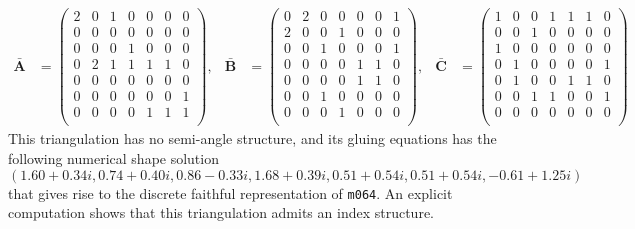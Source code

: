 \documentclass[12pt]{amsart}
\theoremstyle{definition}
\newcommand{\mb}{\mathbf}
\numberwithin{equation}{section}
\begin{document}
{\tiny
\begin{align*}
\bar{\mb A} &=\left(
\begin{array}{ccccccc}
 2 & 0 & 1 & 0 & 0 & 0 & 0 \\
 0 & 0 & 0 & 0 & 0 & 0 & 0 \\
 0 & 0 & 0 & 1 & 0 & 0 & 0 \\
 0 & 2 & 1 & 1 & 1 & 1 & 0 \\
 0 & 0 & 0 & 0 & 0 & 0 & 0 \\
 0 & 0 & 0 & 0 & 0 & 0 & 1 \\
 0 & 0 & 0 & 0 & 1 & 1 & 1 \\
 \end{array}
\right), &
\bar{\mb B} &=
\left(
\begin{array}{ccccccc}
 0 & 2 & 0 & 0 & 0 & 0 & 1 \\
 2 & 0 & 0 & 1 & 0 & 0 & 0 \\
 0 & 0 & 1 & 0 & 0 & 0 & 1 \\
 0 & 0 & 0 & 0 & 1 & 1 & 0 \\
 0 & 0 & 0 & 0 & 1 & 1 & 0 \\
 0 & 0 & 1 & 0 & 0 & 0 & 0 \\
 0 & 0 & 0 & 1 & 0 & 0 & 0 \\
\end{array}
\right), &
\bar{\mb C}&=
\left(
\begin{array}{ccccccc}
 1 & 0 & 0 & 1 & 1 & 1 & 0 \\
 0 & 0 & 1 & 0 & 0 & 0 & 0 \\
 1 & 0 & 0 & 0 & 0 & 0 & 0 \\
 0 & 1 & 0 & 0 & 0 & 0 & 1 \\
 0 & 1 & 0 & 0 & 1 & 1 & 0 \\
 0 & 0 & 1 & 1 & 0 & 0 & 1 \\
 0 & 0 & 0 & 0 & 0 & 0 & 0 \\
\end{array}
\right)
\end{align*}
}
This triangulation has no semi-angle structure, and its gluing equations
has the following numerical shape solution 
{\small
$$
(1.60 + 0.34 i, 
0.74 + 0.40 i, 
0.86 - 0.33 i, 
1.68 + 0.39 i, 
0.51 + 0.54 i, 
0.51 + 0.54 i, 
-0.61 + 1.25 i)
$$
}
that gives rise to the discrete faithful representation
of {\tt m064}. An explicit computation shows that this triangulation admits
an index structure.
\end{document}
